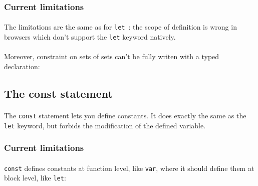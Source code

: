 \documentclass{article}
\begin{document}
\begin{sloppypar}
      

\subsubsection{ Current limitations}


\paragraph{}
The limitations are the same as for \verb!let! : the scope of definition is wrong in browsers which don't support the \verb!let! keyword natively.

         
\paragraph{}
Moreover, constraint on sets of sets can't be fully writen with a typed declaration:
         {}
      
   

   

\subsection{ The const statement}


\paragraph{}
The \verb!const! statement lets you define constants. It does exactly the same as the \verb!let! keyword, but forbids the modification of the defined variable.
      
      {}
      
      

\subsubsection{ Current limitations}


\paragraph{}
\verb!const! defines constants at function level, like \verb!var!, where it should define them at block level, like \verb!let!:
         {}
      

\end{sloppypar}
\end{document}
